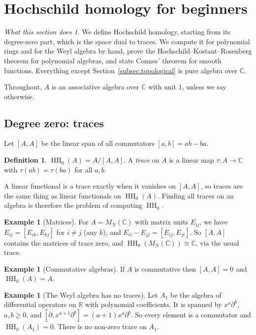 \documentclass[11pt,oneside,reqno]{article}
\DeclareMathOperator{\HH}{HH}
\newcommand{\C}{\mathbb C}
\newcommand{\R}{\mathbb R}
\newcommand{\pa}{\partial}
\theoremstyle{plain}
\theoremstyle{definition}
\newtheorem{definition}[theorem]{Definition}
\newtheorem{example}[theorem]{Example}
\theoremstyle{remark}
\newtheorem*{whatdoes}{What this section does}
\begin{document}
\section{Hochschild homology for beginners}\label{sec:HH}

\begin{whatdoes}
We define Hochschild homology, starting from its degree-zero part, which
is the space dual to traces. We compute it for polynomial rings and for the
Weyl algebra by hand, prove the Hochschild--Kostant--Rosenberg theorem for
polynomial algebras, and state Connes' theorem for smooth functions.
Everything except Section~\ref{subsec:topological} is pure algebra over
\(\C\).
\end{whatdoes}

Throughout, \(A\) is an associative algebra over \(\C\) with unit \(1\),
unless we say otherwise.

\subsection{Degree zero: traces}\label{subsec:HH0}
Let \([A,A]\) be the linear span of all commutators \([a,b]=ab-ba\).

\begin{definition}
\(\HH_0(A)=A/[A,A]\). A \emph{trace} on \(A\) is a linear map
\(\tau:A\to\C\) with \(\tau(ab)=\tau(ba)\) for all \(a,b\).
\end{definition}

A linear functional is a trace exactly when it vanishes on \([A,A]\), so
traces are the same thing as linear functionals on \(\HH_0(A)\). Finding all
traces on an algebra is therefore the problem of computing \(\HH_0\).

\begin{example}[Matrices]\label{ex:matrices}
For \(A=M_N(\C)\) with matrix units \(E_{ij}\), we have \(E_{ij}=[E_{ik},E_{kj}]\)
for \(i\ne j\) (any \(k\)), and \(E_{ii}-E_{jj}=[E_{ij},E_{ji}]\). So \([A,A]\)
contains the matrices of trace zero, and \(\HH_0(M_N(\C))\cong\C\), via the
usual trace.
\end{example}

\begin{example}[Commutative algebras]
If \(A\) is commutative then \([A,A]=0\) and \(\HH_0(A)=A\).
\end{example}

\begin{example}[The Weyl algebra has no traces]\label{ex:weylHH0}
Let \(A_1\) be the algebra of differential operators on \(\R\) with
polynomial coefficients. It is spanned by \(x^a\pa^b\), \(a,b\ge0\), and
\([\pa,x^{a+1}\pa^b]=(a+1)x^a\pa^b\). So every element is a commutator
and \(\HH_0(A_1)=0\). There is no non-zero trace on \(A_1\).
\end{example}
\end{document}
